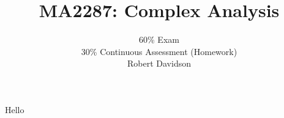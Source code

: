 \documentclass[a4paper, 10pt]{article}
\title{
\textbf{MA2287: Complex Analysis} \\ 
}
\author{
  60\% Exam\\
  30\% Continuous Assessment (Homework) \\
  Robert Davidson
}
\date{} %
\begin{document}
\maketitle
\pagebreak
\tableofcontents
\pagebreak

Hello
\end{document}
